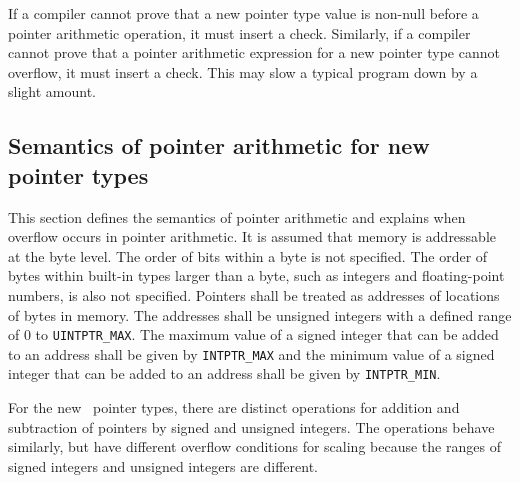 If a compiler cannot prove that a new pointer type value is non-null
before a pointer arithmetic operation, it must insert a check.
Similarly, if a compiler cannot prove that a pointer arithmetic
expression for a new pointer type cannot overflow, it must insert a
check. This may slow a typical program down by a slight amount.

\subsection{Semantics of pointer arithmetic for new pointer types}
\label{section:new-pointer-types-semantics}

This section defines the semantics of pointer arithmetic and explains
when overflow occurs in pointer arithmetic. It is assumed that memory is
addressable at the byte level. The order of bits within a byte is not
specified. The order of bytes within built-in types larger than a byte,
such as integers and floating-point numbers, is also not specified.
Pointers shall be treated as addresses of locations of bytes in memory.
The addresses shall be unsigned integers with a defined range of 0 to
\texttt{UINTPTR\_MAX}. The maximum value of a signed integer that can be
added to an address shall be given by \texttt{INTPTR\_MAX} and the
minimum value of a signed integer that can be added to an address shall
be given by \texttt{INTPTR\_MIN}.

For the new
\arrayptrT\ pointer
types, there are distinct operations for addition and subtraction of
pointers by signed and unsigned integers. The operations behave
similarly, but have different overflow conditions for scaling because
the ranges of signed integers and unsigned integers are different.


